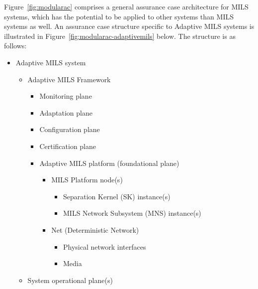 \documentclass[12pt,twoside,a4paper]{article}
\begin{document}
Figure~\ref{fig:modularac} comprises a general assurance case architecture for MILS systems, which has the potential to be applied to other systems than MILS systems as well. An assurance case structure specific to Adaptive MILS systems is illustrated in Figure~\ref{fig:modularac-adaptivemils} below. The structure is as follows: 
\begin{itemize}
\item{Adaptive MILS system}

\begin{itemize}
\item{Adaptive MILS Framework}

\begin{itemize}
\item{Monitoring plane}
\item{Adaptation plane}
\item{Configuration plane}
\item{Certification plane}
\item{Adaptive MILS platform (foundational plane)}

\begin{itemize}
\item{MILS Platform node(s)}
\begin{itemize}
\item{Separation Kernel (SK) instance(s)}
\item{MILS Network Subsystem (MNS) instance(s)}
\end{itemize}
\end{itemize}

\begin{itemize}
\item{Net (Deterministic Network)}
\begin{itemize}
\item{Physical network interfaces}
\item{Media}
\end{itemize}
\end{itemize}

\end{itemize}

\end{itemize}

\begin{itemize}
\item{System operational plane(s)}

\end{itemize}

\end{itemize}
\end{document}
